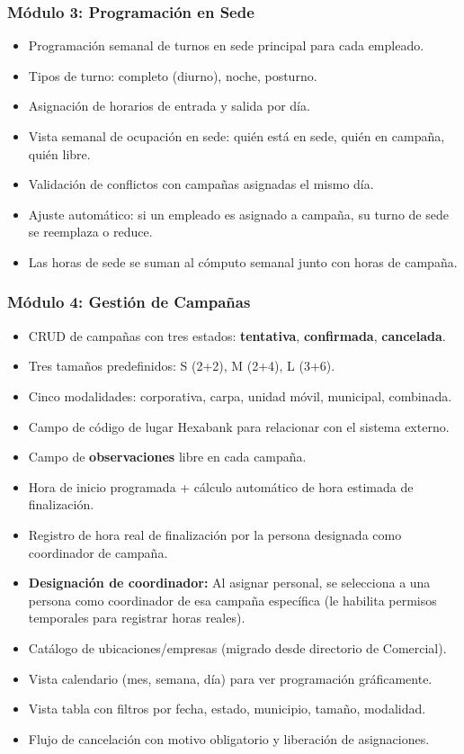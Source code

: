 \documentclass[10pt,a4paper]{article}
\begin{document}
\subsubsection{M\'{o}dulo 3: Programaci\'{o}n en Sede}
\begin{itemize}[leftmargin=2em]
    \item Programaci\'{o}n semanal de turnos en sede principal para cada empleado.
    \item Tipos de turno: completo (diurno), noche, posturno.
    \item Asignaci\'{o}n de horarios de entrada y salida por d\'{i}a.
    \item Vista semanal de ocupaci\'{o}n en sede: qui\'{e}n est\'{a} en sede, qui\'{e}n en campaña, qui\'{e}n libre.
    \item Validaci\'{o}n de conflictos con campañas asignadas el mismo d\'{i}a.
    \item Ajuste autom\'{a}tico: si un empleado es asignado a campaña, su turno de sede se reemplaza o reduce.
    \item Las horas de sede se suman al c\'{o}mputo semanal junto con horas de campaña.
\end{itemize}

\subsubsection{M\'{o}dulo 4: Gesti\'{o}n de Campañas}
\begin{itemize}[leftmargin=2em]
    \item CRUD de campañas con tres estados: \textbf{tentativa}, \textbf{confirmada}, \textbf{cancelada}.
    \item Tres tamaños predefinidos: S (2+2), M (2+4), L (3+6).
    \item Cinco modalidades: corporativa, carpa, unidad m\'{o}vil, municipal, combinada.
    \item Campo de c\'{o}digo de lugar Hexabank para relacionar con el sistema externo.
    \item Campo de \textbf{observaciones} libre en cada campaña.
    \item Hora de inicio programada + c\'{a}lculo autom\'{a}tico de hora estimada de finalizaci\'{o}n.
    \item Registro de hora real de finalizaci\'{o}n por la persona designada como coordinador de campaña.
    \item \textbf{Designaci\'{o}n de coordinador:} Al asignar personal, se selecciona a una persona como coordinador de esa campaña espec\'{i}fica (le habilita permisos temporales para registrar horas reales).
    \item Cat\'{a}logo de ubicaciones/empresas (migrado desde directorio de Comercial).
    \item Vista calendario (mes, semana, d\'{i}a) para ver programaci\'{o}n gr\'{a}ficamente.
    \item Vista tabla con filtros por fecha, estado, municipio, tamaño, modalidad.
    \item Flujo de cancelaci\'{o}n con motivo obligatorio y liberaci\'{o}n de asignaciones.
\end{itemize}
\end{document}
